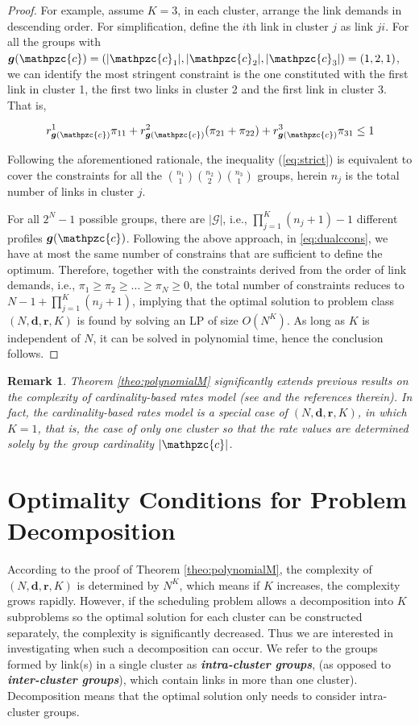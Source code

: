 \documentclass[10pt,onecolumn,journal,draftcls,oneside]{IEEEtran}
\newcounter{rema}
\newtheorem{remark}[rema]{Remark}
\newcounter{exam}
\newcommand{\Cc}{\mathpzc{c}}
\newcommand{\CG}{\mathcal{G}}
\newcommand{\Bd}{\boldsymbol{d}}
\newcommand{\Br}{\boldsymbol{r}}
\newcommand{\Bg}{\boldsymbol{g}}
\begin{document}
\begin{proof}
For example, assume $K = 3$, in each cluster, arrange the link demands in descending order. For simplification, define the $i$th link in cluster $j$ as link $ji$. For all the groups with $\Bg(\Cc) = (|\Cc_1|, |\Cc_2|, |\Cc_3|) = (1, 2, 1)$, we can identify the most stringent constraint is the one constituted with the first link in cluster 1, the first two links in cluster 2 and the first link in cluster 3. That is, 

\begin{equation}
\label{eq:strict}
r^1_{\Bg(\Cc)}\pi_{11} + r^2_{\Bg(\Cc)}(\pi_{21} + \pi_{22}) + r^3_{\Bg(\Cc)}\pi_{31} \leq 1
\end{equation}


Following the aforementioned rationale, the inequality (\ref{eq:strict}) is equivalent to cover the constraints for all the
${n_1 \choose 1} {n_2 \choose 2} {n_3 \choose 1}$ groups, herein $n_j$ is the total number of links in cluster $j$.

For all $2^N-1$ possible groups, there are $|\CG|$, i.e., $\prod_{j=1}^K{(n_j+1)}-1$ different profiles $\Bg(\Cc)$. Following the above approach, in \eqref{eq:dualccons}, we have at most the same number of constrains that are sufficient to define the optimum. Therefore, together with the constraints derived from the order of link demands, i.e., $\pi_1 \geq \pi_2 \geq \dots \geq \pi_N \geq 0$, the total number of constraints reduces to $N-1+\prod_{j=1}^K{(n_j+1)}$, implying that the optimal solution to problem class $(N, \Bd, \Br, K)$ is found by solving an LP of size $O(N^K)$. As long as $K$ is independent of $N$, it can be solved in polynomial time, hence the conclusion follows.
\end{proof}

\begin{remark}
Theorem \ref{theo:polynomialM} significantly extends previous results on the complexity of cardinality-based rates model (see \cite{j12} and the references therein). In fact, the cardinality-based rates model is a special case of $(N, \Bd, \Br, K)$, in which $K=1$, that is, the case of only one cluster so that the rate values are determined solely by the group cardinality $|\Cc|$.
\end{remark}

\section{Optimality Conditions for Problem Decomposition}
\label{sec:oc}
According to the proof of Theorem \ref{theo:polynomialM}, the complexity of $(N, \Bd, \Br, K)$ is determined by $N^K$, which means if $K$ increases, the complexity grows rapidly. However, if the scheduling problem allows a decomposition into $K$ subproblems so the optimal solution for each cluster can be constructed separately, the complexity is significantly decreased. Thus we are interested in investigating when such a decomposition can occur. We refer to the groups formed by link(s) in a single cluster as {\bf\emph{intra-cluster groups}}, (as opposed to {\bf\emph{inter-cluster groups}}), which contain links in more than one cluster). Decomposition means that the optimal solution only needs to consider intra-cluster groups.
\end{document}
